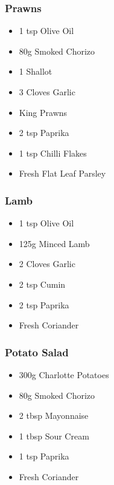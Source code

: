 \documentclass[11pt, english]{article}
\begin{document}
		\subsubsection*{Prawns}

	\begin{itemize}
        \setlength\itemsep{0cm}
                \item 1 tsp Olive Oil
		\item 80g Smoked Chorizo
		\item 1 Shallot
		\item 3 Cloves Garlic
		\item King Prawns
		\item 2 tsp Paprika
		\item 1 tsp Chilli Flakes
		\item Fresh Flat Leaf Parsley
        \end{itemize}

		\subsubsection*{Lamb}

	\begin{itemize}
        \setlength\itemsep{0cm}
                \item 1 tsp Olive Oil
		\item 125g Minced Lamb
		\item 2 Cloves Garlic
		\item 2 tsp Cumin
		\item 2 tsp Paprika
		\item Fresh Coriander
        \end{itemize}

		\subsubsection*{Potato Salad}

	\begin{itemize}
        \setlength\itemsep{0cm}
                \item 300g Charlotte Potatoes
		\item 80g Smoked Chorizo
		\item 2 tbsp Mayonnaise
		\item 1 tbsp Sour Cream
		\item 1 tsp Paprika
		\item Fresh Coriander
        \end{itemize}

\newpage
\end{document}
